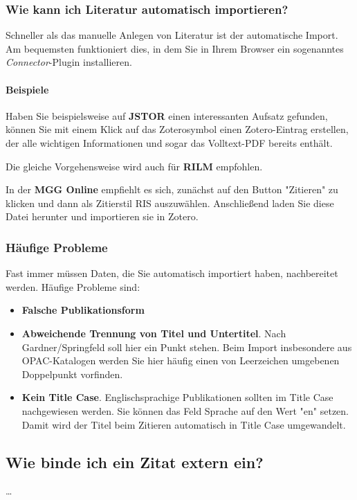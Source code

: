 \subsubsection{Wie kann ich Literatur automatisch importieren?}
Schneller als das manuelle Anlegen von Literatur ist der automatische Import. 
Am bequemsten funktioniert dies, in dem Sie in Ihrem Browser ein sogenanntes 
\textit{Connector}-Plugin installieren.

\paragraph{Beispiele}
Haben Sie beispielsweise auf \textbf{JSTOR} einen interessanten Aufsatz gefunden,
können Sie mit einem Klick auf das Zoterosymbol einen Zotero-Eintrag 
erstellen, der alle wichtigen Informationen und sogar das Volltext-PDF
bereits enthält.

Die gleiche Vorgehensweise wird auch für \textbf{RILM} empfohlen. 

In der \textbf{MGG Online} empfiehlt es sich, zunächst auf den Button "Zitieren" 
zu klicken und dann als Zitierstil RIS auszuwählen. Anschließend laden Sie diese 
Datei herunter und importieren sie in Zotero.

\subsubsection{H\"aufige Probleme}\label{haeufige_probleme}
Fast immer müssen Daten, die Sie automatisch importiert haben, nachbereitet werden. 
Häufige Probleme sind:

\begin{itemize}
    \item \textbf{Falsche Publikationsform}
    \item \textbf{Abweichende Trennung von Titel und Untertitel}. Nach Gardner/Springfeld soll hier ein Punkt stehen. Beim Import 
    insbesondere aus OPAC-Katalogen werden Sie hier häufig einen von Leerzeichen umgebenen Doppelpunkt vorfinden.    
    \item \textbf{Kein Title Case}. Englischsprachige Publikationen sollten im Title Case nachgewiesen werden. Sie können 
    das Feld Sprache auf den Wert "en" setzen. Damit wird der Titel beim Zitieren automatisch in Title Case umgewandelt.    
\end{itemize}

\subsection{Wie binde ich ein Zitat extern ein?}
\dots
